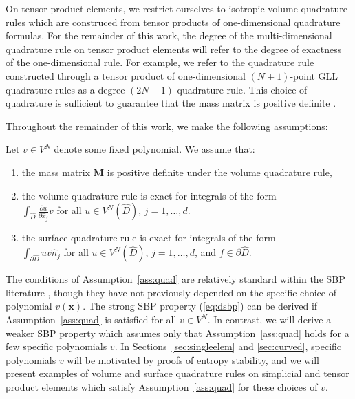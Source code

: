 \documentclass{svjour3}                     %
\renewcommand{\hat}{\widehat}
\newcommand{\pd}[2]{\frac{\partial#1}{\partial#2}}
\newcommand{\LRp}[1]{\left( #1 \right)}
\begin{document}
On tensor product elements, we restrict ourselves to isotropic volume quadrature rules which are construced from tensor products of one-dimensional quadrature formulas.  For the remainder of this work, the degree of the multi-dimensional quadrature rule on tensor product elements will refer to the degree of exactness of the one-dimensional rule.  For example, we refer to the quadrature rule constructed through a tensor product of one-dimensional $(N+1)$-point GLL quadrature rules as a degree $(2N-1)$ quadrature rule.  This choice of quadrature is sufficient to guarantee that the mass matrix is positive definite \cite{canuto2007spectral}.  

Throughout the remainder of this work, we make the following assumptions:
\begin{assumption}
\label{ass:quad}
Let $v \in V^{N}$ denote some fixed polynomial.  We assume that: 
\begin{enumerate}
\item the mass matrix $\bm{M}$ is positive definite under the volume quadrature rule,
\item the volume quadrature rule is exact for integrals of the form\\$\int_{\hat{D}} \pd{u}{\hat{x}_j} v$ for all $u \in V^N\LRp{\hat{D}}$, $j = 1,\ldots, d$.
\item the surface quadrature rule is exact for integrals of the form\\$\int_{\partial \hat{D}} u v \hat{n}_j$ for all $u \in V^N\LRp{\hat{D}}$, $j = 1,\ldots, d$, and $f \in \partial \hat{D}$.  
\end{enumerate}
\end{assumption}

The conditions of Assumption~\ref{ass:quad} are relatively standard within the SBP literature \cite{hicken2016multidimensional, chan2017discretely, crean2018entropy}, though they have not previously depended on the specific choice of polynomial $v(\bm{x})$.   The strong SBP property (\ref{eq:dsbp}) can be derived if Assumption~\ref{ass:quad} is satisfied for all $v \in V^N$.  In contrast, we will derive a weaker SBP property which assumes only that Assumption~\ref{ass:quad} holds for a few specific polynomials $v$.  In Sections~\ref{sec:singleelem} and \ref{sec:curved}, specific polynomials $v$ will be motivated by proofs of entropy stability, and we will present examples of volume and surface quadrature rules on simplicial and tensor product elements which satisfy Assumption~\ref{ass:quad} for these choices of $v$.  
\end{document}
